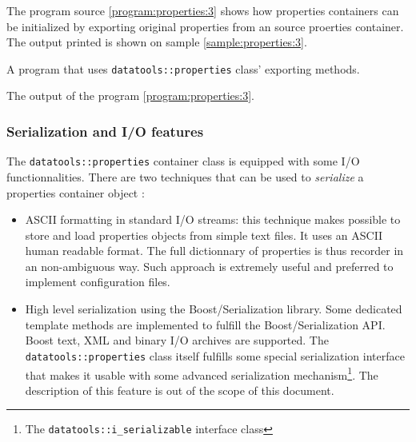 The program source  \ref{program:properties:3} shows how properties
containers can be initialized by exporting original properties from
an source proerties container.
The  output   printed  is  shown   on  sample
\ref{sample:properties:3}.


\begin{program}[h]
\caption{A  program  that  uses  \texttt{datatools::properties}
  class' exporting methods.}
\label{program:properties:3}
\end{program}

\begin{sample}[h]
\caption{The output of the program \ref{program:properties:3}.}
\label{sample:properties:3}
\end{sample}


\subsubsection{Serialization and I/O features}

The \texttt{datatools::properties}  container class is equipped
with some I/O  functionnalities. There are two techniques  that can be
used to \emph{serialize} a properties container object :

\begin{itemize}

\item ASCII  formatting in standard I/O streams:  this technique makes
  possible  to store  and  load properties  objects  from simple  text
  files.  It uses an ASCII human readable format. The full dictionnary
  of  properties  is  thus  recorder  in an  non-ambiguous  way.  Such
  approach is extremely useful and preferred to implement configuration files.

\item High level  serialization using the Boost/Serialization library.
  Some  dedicated  template methods  are  implemented  to fulfill  the
  Boost/Serialization API. Boost text, XML and binary I/O archives are
  supported.  The  \texttt{datatools::properties} class  itself
  fulfills some  special serialization  interface that makes  it usable
  with    some     advanced    serialization    mechanism\footnote{The
    \texttt{datatools::i\_serializable} interface           class}.
  The description  of this feature is out  of the scope
  of this document.

\end{itemize}

